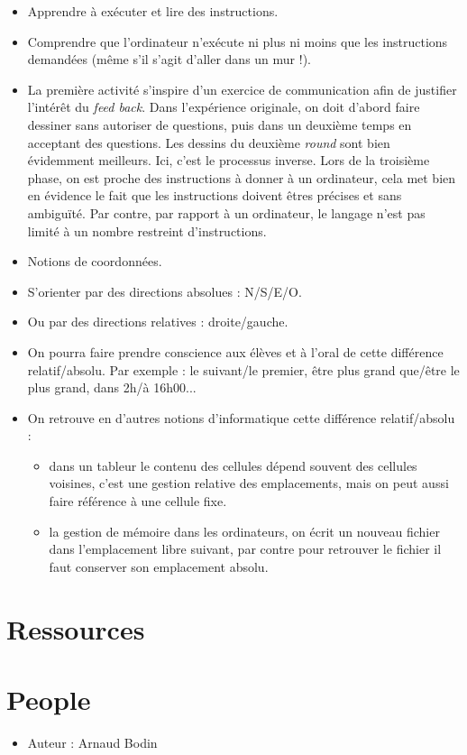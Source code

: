 \documentclass[class=report,crop=false, 12pt]{standalone}
\begin{document}
\begin{itemize}
  \item Apprendre à exécuter et lire des instructions.
  \item Comprendre que l'ordinateur n’exécute ni plus ni moins que les instructions demandées (même s'il s'agit d'aller dans un mur !).

  \item La première activité s'inspire d'un exercice de communication afin de justifier l'intérêt du \emph{feed back}. Dans l'expérience originale, on doit d'abord faire dessiner sans autoriser de questions, puis dans un deuxième temps en acceptant des questions. Les dessins du deuxième \emph{round} sont bien évidemment meilleurs. Ici, c'est le processus inverse. Lors de la troisième phase, on est proche des instructions à donner à un ordinateur, cela met bien en évidence le fait que les instructions doivent êtres précises et sans ambiguïté.  Par contre, par rapport à un ordinateur, le langage n'est pas limité à un nombre restreint d'instructions.   
  
  \item Notions de coordonnées.
  \item S'orienter par des directions absolues : N/S/E/O.
  \item Ou par des directions relatives : droite/gauche.
  \item On pourra faire prendre conscience aux élèves et à l'oral de cette différence relatif/absolu. Par exemple : le suivant/le premier, être plus grand que/être le plus grand, dans 2h/à 16h00...
  \item On retrouve en d'autres notions d'informatique cette différence relatif/absolu :
  \begin{itemize}
    \item dans un tableur le contenu des cellules dépend souvent des cellules voisines, c'est une gestion relative des emplacements, mais on peut aussi faire référence à une cellule fixe. 
    \item la gestion de mémoire dans les ordinateurs, on écrit un nouveau fichier dans l'emplacement libre suivant, par contre pour retrouver le fichier il faut conserver son emplacement absolu.    
  \end{itemize}
\end{itemize}



\section*{Ressources}

\section*{People}

\begin{itemize}
  \item Auteur : Arnaud Bodin
\end{itemize}
\end{document}
